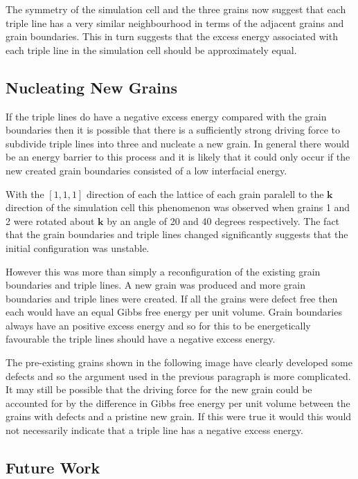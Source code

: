\documentclass[12pt,a4paper]{book}
\begin{document}
The symmetry of the simulation cell and the three grains now suggest that each triple line has a very similar neighbourhood in terms of the adjacent grains and grain boundaries. This in turn suggests that the excess energy associated with each triple line in the simulation cell should be approximately equal.

\subsection{Nucleating New Grains}

If the triple lines do have a negative excess energy compared with the grain boundaries then it is possible that there is a sufficiently strong driving force to subdivide triple lines into three and nucleate a new grain. In general there would be an energy barrier to this process and it is likely that it could only occur if the new created grain boundaries consisted of a low interfacial energy.

With the $[1,1,1]$ direction of each the lattice of each grain paralell to the $\mathbf{k}$ direction of the simulation cell this phenomenon was observed when grains 1 and 2 were rotated about $\mathbf{k}$  by an angle of 20 and 40 degrees respectively. The fact that the grain boundaries and triple lines changed significantly suggests that the initial configuration was unstable. 

However this was more than simply a reconfiguration of the existing grain boundaries and triple lines. A new grain was produced and more grain boundaries and triple lines were created. If all the grains were defect free then each would have an equal Gibbs free energy per unit volume. Grain boundaries always have an positive excess energy and so for this to be energetically favourable the triple lines should have a negative excess energy.

The pre-existing grains shown in the following image have clearly developed some defects and so the argument used in the previous paragraph is more complicated. It may still be possible that the driving force for the new grain could be accounted for by the difference in Gibbs free energy per unit volume between the grains with defects and a pristine new grain. If this were true it would this would not necessarily indicate that a triple line has a negative excess energy.



\subsection{Future Work}
\end{document}
